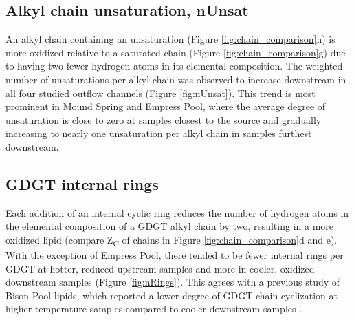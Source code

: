 \subsection{Alkyl chain unsaturation, nUnsat} An alkyl chain containing an unsaturation (Figure \ref{fig:chain_comparison}h) is more oxidized relative to a saturated chain (Figure \ref{fig:chain_comparison}g) due to having two fewer hydrogen atoms in its elemental composition. The weighted number of unsaturations per alkyl chain was observed to increase downstream in all four studied outflow channels (Figure \ref{fig:nUnsat}). This trend is most prominent in Mound Spring and Empress Pool, where the average degree of unsaturation is close to zero at samples closest to the source and gradually increasing to nearly one unsaturation per alkyl chain in samples furthest downstream.



\subsection{GDGT internal rings} Each addition of an internal cyclic ring reduces the number of hydrogen atoms in the elemental composition of a GDGT alkyl chain by two, resulting in a more oxidized lipid (compare Z\textsubscript{C} of chains in Figure \ref{fig:chain_comparison}d and e). With the exception of Empress Pool, there tended to be fewer internal rings per GDGT at hotter,  reduced upstream samples and more in cooler, oxidized downstream samples (Figure \ref{fig:nRings}). This agrees with a previous study of Bison Pool lipids, which reported a lower degree of GDGT chain cyclization at higher temperature samples compared to cooler downstream samples \citep{schubotz2013spatial}.


